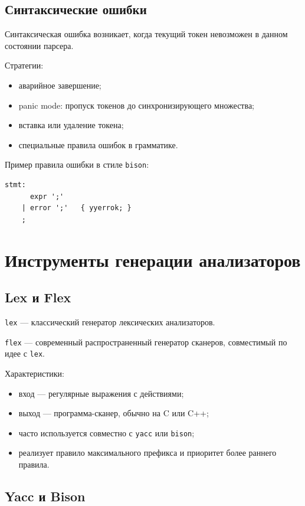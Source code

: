 \documentclass[12pt,a4paper]{article}
\begin{document}
\subsection{Синтаксические ошибки}

Синтаксическая ошибка возникает, когда текущий токен невозможен в данном состоянии парсера.

Стратегии:
\begin{itemize}
    \item аварийное завершение;
    \item panic mode: пропуск токенов до синхронизирующего множества;
    \item вставка или удаление токена;
    \item специальные правила ошибок в грамматике.
\end{itemize}

Пример правила ошибки в стиле \texttt{bison}:
\begin{lstlisting}
stmt:
      expr ';'
    | error ';'   { yyerrok; }
    ;
\end{lstlisting}

\section{Инструменты генерации анализаторов}

\subsection{Lex и Flex}

\texttt{lex} --- классический генератор лексических анализаторов.

\texttt{flex} --- современный распространенный генератор сканеров, совместимый по идее с \texttt{lex}.

Характеристики:
\begin{itemize}
    \item вход --- регулярные выражения с действиями;
    \item выход --- программа-сканер, обычно на C или C++;
    \item часто используется совместно с \texttt{yacc} или \texttt{bison};
    \item реализует правило максимального префикса и приоритет более раннего правила.
\end{itemize}

\subsection{Yacc и Bison}
\end{document}
